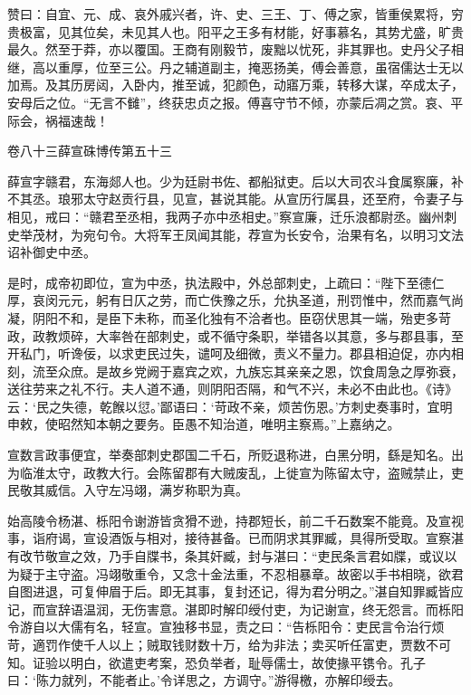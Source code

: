 \documentclass[12pt,UTF8]{ctexbook}
\begin{document}
赞曰：自宜、元、成、哀外戚兴者，许、史、三王、丁、傅之家，皆重侯累将，穷贵极富，见其位矣，未见其人也。阳平之王多有材能，好事慕名，其势尤盛，旷贵最久。然至于莽，亦以覆国。王商有刚毅节，废黜以忧死，非其罪也。史丹父子相继，高以重厚，位至三公。丹之辅道副主，掩恶扬美，傅会善意，虽宿儒达士无以加焉。及其历房闼，入卧内，推至诚，犯颜色，动寤万乘，转移大谋，卒成太子，安母后之位。“无言不雠”，终获忠贞之报。傅喜守节不倾，亦蒙后凋之赏。哀、平际会，祸福速哉！





卷八十三薛宣硃博传第五十三



薛宣字赣君，东海郯人也。少为廷尉书佐、都船狱吏。后以大司农斗食属察廉，补不其丞。琅邪太守赵贡行县，见宣，甚说其能。从宣历行属县，还至府，令妻子与相见，戒曰：“赣君至丞相，我两子亦中丞相史。”察宣廉，迁乐浪都尉丞。幽州刺史举茂材，为宛句令。大将军王凤闻其能，荐宣为长安令，治果有名，以明习文法诏补御史中丞。



是时，成帝初即位，宣为中丞，执法殿中，外总部刺史，上疏曰：“陛下至德仁厚，哀闵元元，躬有日仄之劳，而亡佚豫之乐，允执圣道，刑罚惟中，然而嘉气尚凝，阴阳不和，是臣下未称，而圣化独有不洽者也。臣窃伏思其一端，殆吏多苛政，政教烦碎，大率咎在部刺史，或不循守条职，举错各以其意，多与郡县事，至开私门，听谗佞，以求吏民过失，谴呵及细微，责义不量力。郡县相迫促，亦内相刻，流至众庶。是故乡党阙于嘉宾之欢，九族忘其亲亲之恩，饮食周急之厚弥衰，送往劳来之礼不行。夫人道不通，则阴阳否隔，和气不兴，未必不由此也。《诗》云：‘民之失德，乾餱以愆。’鄙语曰：‘苛政不亲，烦苦伤恩。’方刺史奏事时，宜明申敕，使昭然知本朝之要务。臣愚不知治道，唯明主察焉。”上嘉纳之。



宣数言政事便宜，举奏部刺史郡国二千石，所贬退称进，白黑分明，繇是知名。出为临淮太守，政教大行。会陈留郡有大贼废乱，上徙宣为陈留太守，盗贼禁止，吏民敬其威信。入守左冯翊，满岁称职为真。



始高陵令杨湛、栎阳令谢游皆贪猾不逊，持郡短长，前二千石数案不能竟。及宣视事，诣府谒，宣设酒饭与相对，接待甚备。已而阴求其罪臧，具得所受取。宣察湛有改节敬宣之效，乃手自牒书，条其奸臧，封与湛曰：“吏民条言君如牒，或议以为疑于主守盗。冯翊敬重令，又念十金法重，不忍相暴章。故密以手书相晓，欲君自图进退，可复伸眉于后。即无其事，复封还记，得为君分明之。”湛自知罪臧皆应记，而宣辞语温润，无伤害意。湛即时解印绶付吏，为记谢宣，终无怨言。而栎阳令游自以大儒有名，轻宣。宣独移书显，责之曰：“告栎阳令：吏民言令治行烦苛，適罚作使千人以上；贼取钱财数十万，给为非法；卖买听任富吏，贾数不可知。证验以明白，欲遣吏考案，恐负举者，耻辱儒士，故使掾平镌令。孔子曰：‘陈力就列，不能者止。’令详思之，方调守。”游得檄，亦解印绶去。
\end{document}
